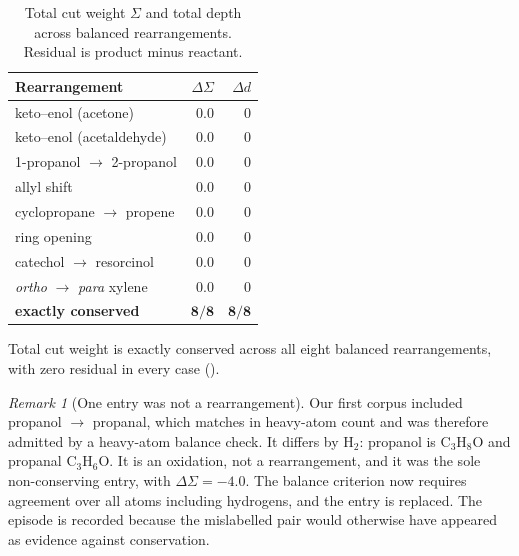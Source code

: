 \documentclass[11pt,twocolumn,a4paper]{article}
\theoremstyle{upthm}
\theoremstyle{definition}
\theoremstyle{remark}
\newtheorem{remark}[theorem]{Remark}
\newcommand{\dep}{d}
\begin{document}
\begin{table}[htbp]
\centering\small
\caption{Total cut weight $\Sigma$ and total depth across balanced
rearrangements. Residual is product minus reactant.}
\label{tab:conservation}
\begin{tabular}{@{}lrr@{}}
\toprule
Rearrangement & $\Delta\Sigma$ & $\Delta\dep$\\
\midrule
keto--enol (acetone) & $0.0$ & $0$\\
keto--enol (acetaldehyde) & $0.0$ & $0$\\
1-propanol $\to$ 2-propanol & $0.0$ & $0$\\
allyl shift & $0.0$ & $0$\\
cyclopropane $\to$ propene & $0.0$ & $0$\\
ring opening & $0.0$ & $0$\\
catechol $\to$ resorcinol & $0.0$ & $0$\\
\emph{ortho} $\to$ \emph{para} xylene & $0.0$ & $0$\\
\midrule
\textbf{exactly conserved} & $\mathbf{8/8}$ & $\mathbf{8/8}$\\
\bottomrule
\end{tabular}
\end{table}

Total cut weight is exactly conserved across all eight balanced
rearrangements, with zero residual in every case
().

\begin{remark}[One entry was not a rearrangement]
\label{rem:oxidation}
Our first corpus included propanol $\to$ propanal, which matches in
heavy-atom count and was therefore admitted by a heavy-atom balance
check. It differs by $\mathrm{H}_2$: propanol is
$\mathrm{C_3H_8O}$ and propanal $\mathrm{C_3H_6O}$. It is an oxidation,
not a rearrangement, and it was the sole non-conserving entry, with
$\Delta\Sigma=-4.0$. The balance criterion now requires agreement over
all atoms including hydrogens, and the entry is replaced. The episode is
recorded because the mislabelled pair would otherwise have appeared as
evidence against conservation.
\end{remark}
\end{document}
